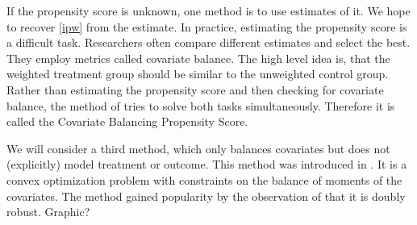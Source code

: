 If the propensity score is unknown, one method is to use estimates of it.
We hope to recover \eqref{ipw} from the estimate.
In practice, estimating the propensity score is a difficult task.
Researchers often compare different estimates and select the best. 
They employ metrics called covariate balance.
The high level idea is, that the weighted treatment group should be similar to the unweighted control group. 
Rather than estimating the propensity score and then checking for covariate balance,
the method of \cite{Imai2014a} tries to solve both tasks simultaneously.
Therefore it is called the Covariate Balancing Propensity Score.

We will consider a third method, which only balances covariates but does not (explicitly) model treatment or outcome.
This method was introduced in \cite{Hainmueller2012}. 
It is a convex optimization problem with constraints on the balance of moments of the covariates.
The method gained popularity by the observation of \cite{Zhao2017a}
that it is doubly robust.
Graphic?

